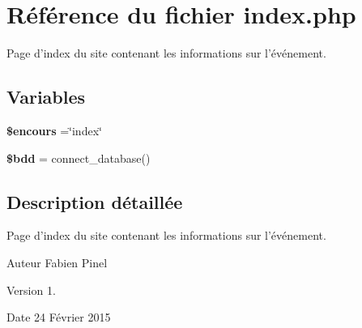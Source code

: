 \hypertarget{index_8php}{\section{Référence du fichier index.\-php}
\label{index_8php}
}


Page d'index du site contenant les informations sur l'événement.  


\subsection*{Variables}
\begin{DoxyCompactItemize}
\item 
\hypertarget{index_8php_af7b0e56292699e6983c24fbbf70ce08d}{{\bfseries \$encours} =\char`\"{}index\char`\"{}}\label{index_8php_af7b0e56292699e6983c24fbbf70ce08d}

\item 
\hypertarget{index_8php_a94f91e878bce0991e2cd595c5dd79b3f}{{\bfseries \$bdd} = connect\-\_\-database()}\label{index_8php_a94f91e878bce0991e2cd595c5dd79b3f}

\end{DoxyCompactItemize}


\subsection{Description détaillée}
Page d'index du site contenant les informations sur l'événement. \begin{DoxyAuthor}{Auteur}
Fabien Pinel 
\end{DoxyAuthor}
\begin{DoxyVersion}{Version}
1. 
\end{DoxyVersion}
\begin{DoxyDate}{Date}
24 Février 2015 
\end{DoxyDate}
